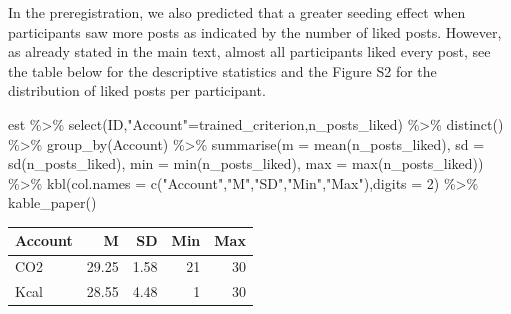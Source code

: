 \documentclass[
  letterpaper,
  DIV=11,
  numbers=noendperiod]{scrartcl}
\newenvironment{Shaded}{\begin{snugshade}}{\end{snugshade}}
\newcommand{\AttributeTok}[1]{\textcolor[rgb]{0.40,0.45,0.13}{#1}}
\newcommand{\DecValTok}[1]{\textcolor[rgb]{0.68,0.00,0.00}{#1}}
\newcommand{\FunctionTok}[1]{\textcolor[rgb]{0.28,0.35,0.67}{#1}}
\newcommand{\NormalTok}[1]{\textcolor[rgb]{0.00,0.23,0.31}{#1}}
\newcommand{\OtherTok}[1]{\textcolor[rgb]{0.00,0.23,0.31}{#1}}
\newcommand{\SpecialCharTok}[1]{\textcolor[rgb]{0.37,0.37,0.37}{#1}}
\newcommand{\StringTok}[1]{\textcolor[rgb]{0.13,0.47,0.30}{#1}}
\begin{document}
In the preregistration, we also predicted that a greater seeding effect
when participants saw more posts as indicated by the number of liked
posts. However, as already stated in the main text, almost all
participants liked every post, see the table below for the descriptive
statistics and the Figure S2 for the distribution of liked posts per
participant.

\begin{Shaded}
\begin{Highlighting}[]
\NormalTok{est }\SpecialCharTok{\%\textgreater{}\%} 
  \FunctionTok{select}\NormalTok{(ID,}\StringTok{"Account"}\OtherTok{=}\NormalTok{trained\_criterion,n\_posts\_liked) }\SpecialCharTok{\%\textgreater{}\%} 
  \FunctionTok{distinct}\NormalTok{() }\SpecialCharTok{\%\textgreater{}\%} 
  \FunctionTok{group\_by}\NormalTok{(Account) }\SpecialCharTok{\%\textgreater{}\%} 
  \FunctionTok{summarise}\NormalTok{(}\AttributeTok{m   =} \FunctionTok{mean}\NormalTok{(n\_posts\_liked),}
            \AttributeTok{sd  =} \FunctionTok{sd}\NormalTok{(n\_posts\_liked),}
            \AttributeTok{min =} \FunctionTok{min}\NormalTok{(n\_posts\_liked),}
            \AttributeTok{max =} \FunctionTok{max}\NormalTok{(n\_posts\_liked)) }\SpecialCharTok{\%\textgreater{}\%} 
  \FunctionTok{kbl}\NormalTok{(}\AttributeTok{col.names =} \FunctionTok{c}\NormalTok{(}\StringTok{"Account"}\NormalTok{,}\StringTok{"M"}\NormalTok{,}\StringTok{"SD"}\NormalTok{,}\StringTok{"Min"}\NormalTok{,}\StringTok{"Max"}\NormalTok{),}\AttributeTok{digits =} \DecValTok{2}\NormalTok{) }\SpecialCharTok{\%\textgreater{}\%} 
  \FunctionTok{kable\_paper}\NormalTok{()}
\end{Highlighting}
\end{Shaded}

\begin{table}
\centering
\begin{tabular}[t]{l|r|r|r|r}
\hline
Account & M & SD & Min & Max\\
\hline
CO2 & 29.25 & 1.58 & 21 & 30\\
\hline
Kcal & 28.55 & 4.48 & 1 & 30\\
\hline
\end{tabular}
\end{table}
\end{document}
